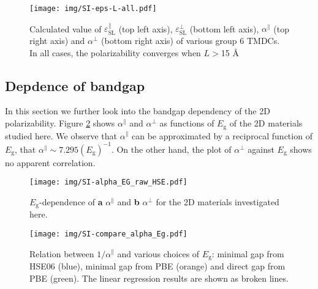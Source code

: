 \documentclass[manuscript=suppinfo,email=true,hyperref=true,keywords=false]{achemso}
\begin{document}
\begin{figure}[htbp]
  \centering
  \texttt{[image: img/SI-eps-L-all.pdf]} 
  \caption{Calculated value of $\varepsilon_{\mathrm{SL}}^{\parallel}$
    (top left axis), $\varepsilon_{\mathrm{SL}}^{\perp}$ (bottom left
    axis), $\alpha^{\parallel}$ (top right axis) and $\alpha^{\perp}$
    (bottom right axis) of various group 6 TMDCs. In all cases, the
    polarizability  converges when $L>$15 \AA{}}
  \label{fig:eps-L-all}
\end{figure}


\subsection{Depdence of bandgap}
\label{sec:pol-2D-2}

In this section we further look into the bandgap dependency of the 2D
polarizability. Figure \ref{fig:SI-raw-HSE} shows $\alpha^{\parallel}$
and $\alpha^{\perp}$ as functions of $E_{\mathrm{g}}$ of the 2D
materials studied here. We observe that $\alpha^{\parallel}$ can be
approximated by a reciprocal function of $E_{\mathrm{g}}$, that
$\alpha^{\parallel}\sim{} 7.295(E_{\mathrm{g}})^{-1}$. On the other
hand, the plot of $\alpha^{\perp}$ against $E_{\mathrm{g}}$ shows no
apparent correlation.
\begin{figure}[htbp]
  \centering
  \texttt{[image: img/SI-alpha\_EG\_raw\_HSE.pdf]}
  \caption{$E_{\mathrm{g}}$-dependence of    \textbf{a} $\alpha^{\parallel}$ and
    \textbf{b} $\alpha^{\perp}$ for the 2D materials investigated here.}
  \label{fig:SI-raw-HSE}
\end{figure}

\begin{figure}[htbp]
  \centering
  \texttt{[image: img/SI-compare\_alpha\_Eg.pdf]}
  \caption{Relation between $1/\alpha^{\parallel}$ and various choices
    of $E_{\mathrm{g}}$: minimal gap from HSE06 (blue), minimal gap
    from PBE (orange) and direct gap from PBE (green). The linear
    regression results are shown as broken lines.}
  \label{fig:alpha-Eg-diff}
\end{figure}
\end{document}
